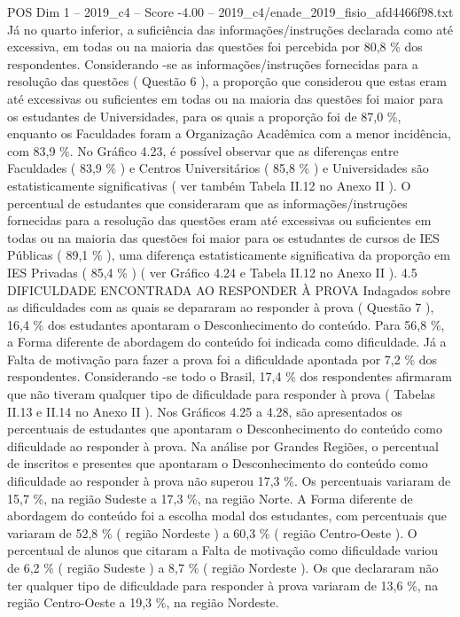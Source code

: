 \begin{textsample}{POS Dim 1 – 2019\_c4 – Score -4.00 – 2019\_c4/enade\_2019\_fisio\_afd4466f98.txt}
Já no quarto inferior, a suficiência das informações/instruções declarada como até excessiva, em todas ou na maioria das questões foi percebida por 80,8 \% dos respondentes.
Considerando -se as informações/instruções fornecidas para a resolução das questões ( Questão 6 ), a proporção que considerou que estas eram até excessivas ou suficientes em todas ou na maioria das questões foi maior para os estudantes de Universidades, para os quais a proporção foi de 87,0 \%, enquanto os Faculdades foram a Organização Acadêmica com a menor incidência, com 83,9 \%.
No Gráfico 4.23, é possível observar que as diferenças entre Faculdades ( 83,9 \% ) e Centros Universitários ( 85,8 \% ) e Universidades são estatisticamente significativas ( ver também Tabela II.12 no Anexo II ).
O percentual de estudantes que consideraram que as informações/instruções fornecidas para a resolução das questões eram até excessivas ou suficientes em todas ou na maioria das questões foi maior para os estudantes de cursos de IES Públicas ( 89,1 \% ), uma diferença estatisticamente significativa da proporção em IES Privadas ( 85,4 \% ) ( ver Gráfico 4.24 e Tabela II.12 no Anexo II ). 4.5 DIFICULDADE ENCONTRADA AO RESPONDER À PROVA Indagados sobre as dificuldades com as quais se depararam ao responder à prova ( Questão 7 ), 16,4 \% dos estudantes apontaram o Desconhecimento do conteúdo.
Para 56,8 \%, a Forma diferente de abordagem do conteúdo foi indicada como dificuldade.
Já a Falta de motivação para fazer a prova foi a dificuldade apontada por 7,2 \% dos respondentes.
Considerando -se todo o Brasil, 17,4 \% dos respondentes afirmaram que não tiveram qualquer tipo de dificuldade para responder à prova ( Tabelas II.13 e II.14 no Anexo II ).
Nos Gráficos 4.25 a 4.28, são apresentados os percentuais de estudantes que apontaram o Desconhecimento do conteúdo como dificuldade ao responder à prova.
Na análise por Grandes Regiões, o percentual de inscritos e presentes que apontaram o Desconhecimento do conteúdo como dificuldade ao responder à prova não superou 17,3 \%.
Os percentuais variaram de 15,7 \%, na região Sudeste a 17,3 \%, na região Norte.
A Forma diferente de abordagem do conteúdo foi a escolha modal dos estudantes, com percentuais que variaram de 52,8 \% ( região Nordeste ) a 60,3 \% ( região Centro-Oeste ).
O percentual de alunos que citaram a Falta de motivação como dificuldade variou de 6,2 \% ( região Sudeste ) a 8,7 \% ( região Nordeste ).
Os que declararam não ter qualquer tipo de dificuldade para responder à prova variaram de 13,6 \%, na região Centro-Oeste a 19,3 \%, na região Nordeste.

\end{textsample}
